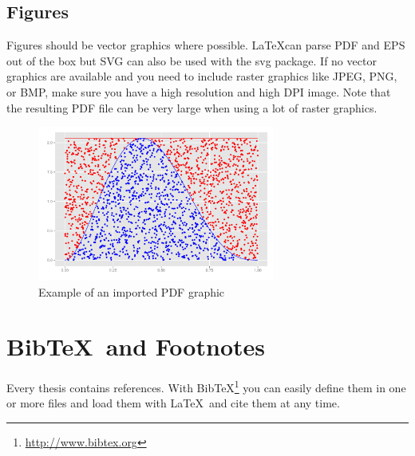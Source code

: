 \documentclass[masterarbeit,grey]{mas-thesis-sections}				%
\begin{document}
\subsection{Figures}

Figures should be vector graphics where possible. \LaTeX can parse PDF and EPS out of the box but SVG can also be used with the svg package. If no vector graphics are available and you need to include raster graphics like JPEG, PNG, or BMP, make sure you have a high resolution and high DPI image. Note that the resulting PDF file can be very large when using a lot of raster graphics.

\begin{figure}[ht]
	\centering
	\includegraphics[height=5.1cm]{graphics/demo-graphic.pdf}
	\caption{Example of an imported PDF graphic}
	\label{figure:1}
\end{figure}

\newpage

\section{Bib\TeX\ and Footnotes}

Every thesis contains references. With Bib\TeX\footnote{\url{http://www.bibtex.org}} you can easily define them in one or more files and load them with \LaTeX\ and cite them at any time.\cite{exampleBook}
\cleardoublepage

\printbibliography

%
%
\makelicensepageCCBYSA
\end{document}
